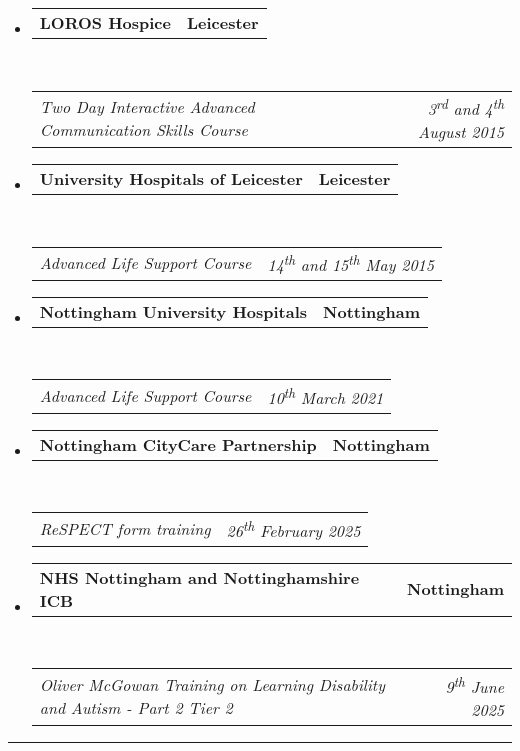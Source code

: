 \documentclass{article}
\makeatletter
\newcommand{\headerrow}[2]
{\begin{tabular*}{\linewidth}{l@{\extracolsep{\fill}}r}
	#1 &
	#2 \\
\end{tabular*}}
\makeatother
\begin{document}
\begin{itemize}
	\parskip=0.1em
	\item
	\headerrow
		{\textbf{LOROS Hospice}}
		{\textbf{Leicester}}
	\\
	\headerrow
		{\emph{Two Day Interactive Advanced Communication Skills Course}}
		{\emph{3\textsuperscript{rd} and 4\textsuperscript{th} August 2015}}
	\item
	\headerrow
		{\textbf{University Hospitals of Leicester}}
		{\textbf{Leicester}}
	\\
	\headerrow
		{\emph{Advanced Life Support Course}}
		{\emph{14\textsuperscript{th} and 15\textsuperscript{th} May 2015}}
	
	\item
	\headerrow
		{\textbf{Nottingham University Hospitals}}
		{\textbf{Nottingham}}
	\\
	\headerrow
		{\emph{Advanced Life Support Course}}
		{\emph{10\textsuperscript{th} March 2021}}
	\item
	\headerrow
		{\textbf{Nottingham CityCare Partnership}}
		{\textbf{Nottingham}}
	\\
	\headerrow
		{\emph{ReSPECT form training}}
		{\emph{26\textsuperscript{th} February 2025}}
	\item
	\headerrow
		{\textbf{NHS Nottingham and Nottinghamshire ICB}}
		{\textbf{Nottingham}}
	\\
	\headerrow
		{\emph{Oliver McGowan Training on Learning Disability and Autism - Part 2 Tier 2}}
		{\emph{9\textsuperscript{th} June 2025}}
\end{itemize}
\hrule
\end{document}
